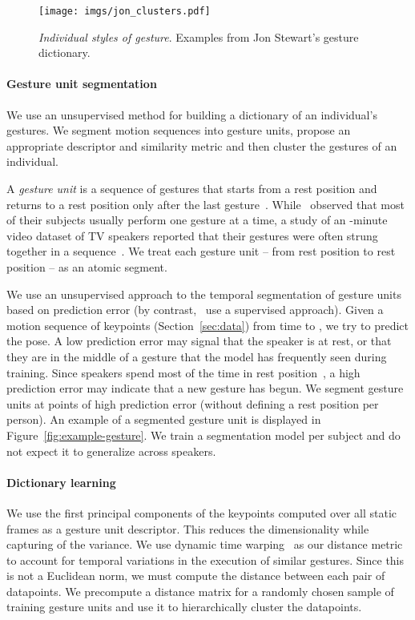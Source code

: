 \documentclass[10pt,twocolumn,letterpaper]{article}
\newcommand{\mypar}[1]{\vspace{-2mm}\paragraph{#1}}
\begin{document}
\begin{figure}
\begin{center}
\texttt{[image: imgs/jon\_clusters.pdf]}\end{center}
  \caption{\emph{Individual styles of gesture}. Examples from Jon Stewart's gesture dictionary.}
\label{fig:space-of-gesures}
\end{figure}

\paragraph{Gesture unit segmentation}
We use an unsupervised method for building a dictionary of an individual's gestures. We segment motion sequences into gesture units, propose an appropriate descriptor and similarity metric and then cluster the gestures of an individual.

A \textit{gesture unit} is a sequence of gestures that starts from a rest position and returns to a rest position only after the last gesture~\cite{kendon_2004}. While~\cite{McNeill92} observed that most of their subjects usually perform one gesture at a time, a study of an -minute video dataset of TV speakers reported that their gestures were often strung together in a sequence~\cite{Kipp-synthesis}. We treat each gesture unit -- from rest position to rest position -- as an atomic segment.

We use an unsupervised approach to the temporal segmentation of gesture units based on prediction error (by contrast,~\cite{SVN-segmentation} use a supervised approach). Given a motion sequence of keypoints (Section~\ref{sec:data}) from time  to , we try to predict the  pose. A low prediction error may signal that the speaker is at rest, or that they are in the middle of a gesture that the model has frequently seen during training. Since speakers spend most of the time in rest position~\cite{kendon_2004}, a high prediction error may indicate that a new gesture has begun. We segment gesture units at points of high prediction error (without defining a rest position per person). An example of a segmented gesture unit is displayed in Figure~\ref{fig:example-gesture}.  We train a segmentation model per subject and do not expect it to generalize across speakers.

\mypar{Dictionary learning} We use the first  principal components of the keypoints computed over all static frames as a gesture unit descriptor. This reduces the dimensionality while capturing  of the variance. We use dynamic time warping~\cite{dtw} as our distance metric to account for temporal variations in the execution of similar gestures. Since this is not a Euclidean norm, we must compute the distance between each pair of datapoints. We precompute a distance matrix for a randomly chosen sample of  training gesture units and use it to hierarchically cluster the datapoints. 
\end{document}
